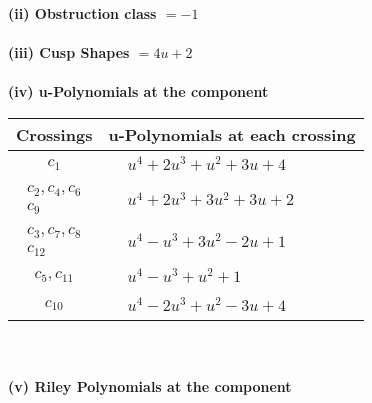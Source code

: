 \documentclass[1p]{elsarticle_modified}
\theoremstyle{definition}
\begin{document}
\flushleft \textbf{(ii) Obstruction class $= -1$}\\~\\
\flushleft \textbf{(iii) Cusp Shapes $= 4 u+2$}\\~\\
\newpage\renewcommand{\arraystretch}{1}
\flushleft \textbf{(iv) u-Polynomials at the component}\newline \\
\begin{tabular}{m{50pt}|m{274pt}}
Crossings & \hspace{64pt}u-Polynomials at each crossing \\
\hline $$\begin{aligned}c_{1}\end{aligned}$$&$\begin{aligned}
&u^4+2 u^3+u^2+3 u+4
\end{aligned}$\\
\hline $$\begin{aligned}c_{2},c_{4},c_{6}\\c_{9}\end{aligned}$$&$\begin{aligned}
&u^4+2 u^3+3 u^2+3 u+2
\end{aligned}$\\
\hline $$\begin{aligned}c_{3},c_{7},c_{8}\\c_{12}\end{aligned}$$&$\begin{aligned}
&u^4- u^3+3 u^2-2 u+1
\end{aligned}$\\
\hline $$\begin{aligned}c_{5},c_{11}\end{aligned}$$&$\begin{aligned}
&u^4- u^3+u^2+1
\end{aligned}$\\
\hline $$\begin{aligned}c_{10}\end{aligned}$$&$\begin{aligned}
&u^4-2 u^3+u^2-3 u+4
\end{aligned}$\\
\hline
\end{tabular}\\~\\
\newpage\renewcommand{\arraystretch}{1}
\flushleft \textbf{(v) Riley Polynomials at the component}\newline \\
\end{document}
